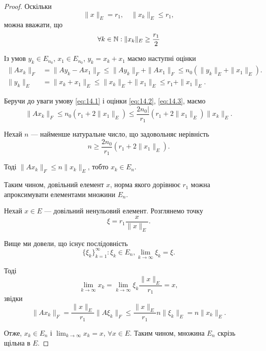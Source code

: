 \begin{proof}
Оскільки
\begin{equation*}
    \|x\|_E = r_1, \quad \|x_k\|_E \le r_1,
\end{equation*}
можна вважати, що
\begin{equation}
    \label{eq:14.1}
    \forall k \in \mathbb{N}: \|x_k\|_E \ge \frac{r_1}{2}
\end{equation}

Із умов $y_k \in E_{n_0}$, $x_1 \in E_{n_0}$, $y_k = x_k + x_1$
маємо наступні оцінки
\begin{align}
    \label{eq:14.2}
    \|Ax_k\|_F &= \|A y_k - A x_1\|_F \le \|A y_k\|_F + \|A x_1\|_F \le n_0 (\|y_k\|_E + \|x_1\|_E). \\
    \label{eq:14.3}
    \|y_k\|_E &= \|x_k + x_1\|_E \le \|x_k\|_E + \|x_1\|_E \le r_1 + \|x_1\|_E.
\end{align}

Беручи до уваги умову \eqref{eq:14.1} і оцінки \eqref{eq:14.2}, \eqref{eq:14.3}, маємо
\begin{equation*}
    \|A x_k\|_F \le
    n_0 (r_1 + 2 \|x_1\|_E) \le
    \frac{2 n_0|}{r_1} (r_1 + 2 \|x_1\|_E) \|x_k\|_E.
\end{equation*}

Нехай $n$ --- найменше натуральне число, що задовольняє нерівність
\begin{equation*}
    n \ge \frac{2 n_0}{r_1} (r_1 + 2 \|x_1\|_E).
\end{equation*}

Тоді $\|Ax_k\|_F \le n \|x_k\|_E$, тобто $x_k \in E_n$.

Таким чином, довільний елемент $x$, норма якого дорівнює
$r_1$ можна апроксимувати елементами множини $E_n$.

Нехай $x \in E$ --- довільний ненульовий елемент.
Розглянемо точку 
\begin{equation*}
    \xi = r_1 \frac{x}{\|x\|_E}.
\end{equation*}

Вище ми довели, що існує послідовність
\begin{equation*}
    \{\xi_k\}_{k = 1}^\infty: \xi_k \in E_n, \lim_{k \to \infty} \xi_k = \xi.
\end{equation*}

Тоді
\begin{equation*}
    \lim_{k \to \infty} x_k = \lim_{k \to \infty} \xi_k \frac{\|x\|_E}{r_1} = x,
\end{equation*}
звідки
\begin{equation*}
    \|Ax_k\|_F = \frac{\|x\|_E}{r_1} \|A\xi_k\|_F \le \frac{\|x\|_E}{r_1} n \|\xi_k\|_E = n \|x_k\|_E.
\end{equation*}

Отже, $x_k \in E_n$ і $\lim_{k \to \infty} x_k = x$, $\forall x \in E$.
Таким чином, множина $E_n$ скрізь щільна в $E$.
\end{proof}

